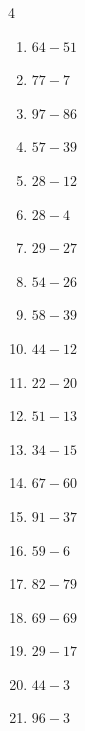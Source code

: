 \begin{multicols}{4}
\begin{enumerate}
  \item $64-51$
        \phantom{$=13$}

  \item $77-7$
        \phantom{$=70$}

  \item $97-86$
        \phantom{$=11$}

  \item $57-39$
        \phantom{$=18$}

  \item $28-12$
        \phantom{$=16$}

  \item $28-4$
        \phantom{$=24$}

  \item $29-27$
        \phantom{$=2$}

  \item $54-26$
        \phantom{$=28$}

  \item $58-39$
        \phantom{$=19$}

  \item $44-12$
        \phantom{$=32$}

  \item $22-20$
        \phantom{$=2$}

  \item $51-13$
        \phantom{$=38$}

  \item $34-15$
        \phantom{$=19$}

\columnbreak %

\resetques

  \item $67-60$
        \phantom{$=7$}

  \item $91-37$
        \phantom{$=54$}

  \item $59-6$
        \phantom{$=53$}

  \item $82-79$
        \phantom{$=3$}

  \item $69-69$
        \phantom{$=0$}

  \item $29-17$
        \phantom{$=12$}

  \item $44-3$
        \phantom{$=41$}

  \item $96-3$
        \phantom{$=93$}


\end{enumerate}
\end{multicols}
